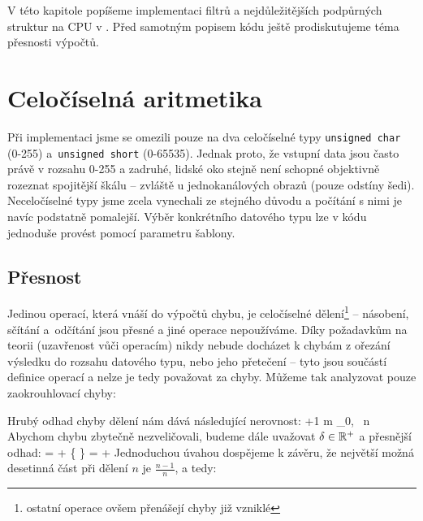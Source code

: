 

V této kapitole popíšeme implementaci filtrů a nejdůležitějších podpůrných struktur na CPU v \Cpp. Před samotným popisem kódu ještě prodiskutujeme téma přesnosti výpočtů.

    \section{Celočíselná aritmetika}

    Při implementaci jsme se omezili pouze na dva celočíselné typy {\tt unsigned char} (0-255) a~{\tt unsigned short} (0-65535). Jednak proto, že vstupní data jsou často právě v rozsahu 0-255 a zadruhé, lidské oko stejně není schopné objektivně rozeznat spojitější škálu -- zvláště u jednokanálových obrazů (pouze odstíny šedi). Neceločíselné typy jsme zcela vynechali ze stejného důvodu a počítání s nimi je navíc podstatně pomalejší. Výběr konkrétního datového typu lze v kódu jednoduše provést pomocí parametru šablony.

        \subsection{Přesnost}

        Jedinou operací, která vnáší do výpočtů chybu, je celočíselné dělení\footnote{ostatní operace ovšem přenášejí chyby již vzniklé} -- násobení, sčítání a~odčítání jsou přesné a jiné operace nepoužíváme. Díky požadavkům na teorii (uzavřenost vůči operacím) nikdy nebude docházet k chybám z ořezání výsledku do rozsahu datového typu, nebo jeho přetečení -- tyto jsou součástí definice operací a nelze je tedy považovat za chyby. Můžeme tak analyzovat pouze zaokrouhlovací chyby:

        Hrubý odhad chyby dělení nám dává následující nerovnost:
        \beq
         \le \Big\lfloor {} \Big\rfloor +1 \qquad m \in \Nn_0, \, n \in \Nn
        \eeq
        Abychom chybu zbytečně nezveličovali, budeme dále uvažovat $\delta \in \mathbb{R}^+$ a přesnější odhad:
        \beq
         = \Big\lfloor {} \Big\rfloor + \Big\{  \Big\} = \Big\lfloor {} \Big\rfloor + \delta
        \eeq
        Jednoduchou úvahou dospějeme k závěru, že největší možná desetinná část při dělení $n$ je $\frac{n-1}{n}$, a tedy:
        \beq
        \delta \leq {}
        \eeq


